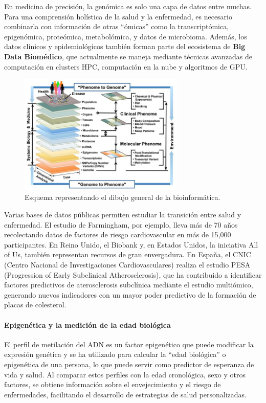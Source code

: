 En medicina de precisión, la genómica es solo una capa de datos entre muchas. Para una comprensión holística de la salud y la enfermedad, es necesario combinarla con información de otras “ómicas” como la transcriptómica, epigenómica, proteómica, metabolómica, y datos de microbioma. Además, los datos clínicos y epidemiológicos también forman parte del ecosistema de \textbf{Big Data Biomédico}, que actualmente se maneja mediante técnicas avanzadas de computación en clusters HPC, computación en la nube y algoritmos de GPU.

\begin{figure}[htbp]
\centering
\includegraphics[width = 0.7\textwidth]{figs/bigger-picture-bioinfo.jpg}
\caption{Esquema representando el dibujo general de la bioinformática.}
\end{figure}

Varias bases de datos públicas permiten estudiar la transición entre salud y enfermedad. El estudio de Farmingham, por ejemplo, lleva más de 70 años recolectando datos de factores de riesgo cardiovascular en más de 15,000 participantes. En Reino Unido, el Biobank y, en Estados Unidos, la iniciativa All of Us, también representan recursos de gran envergadura. En España, el CNIC (Centro Nacional de Investigaciones Cardiovasculares) realiza el estudio PESA (Progression of Early Subclinical Atherosclerosis), que ha contribuido a identificar factores predictivos de aterosclerosis subclínica mediante el estudio multiómico, generando nuevos indicadores con un mayor poder predictivo de la formación de placas de colesterol.

\paragraph{Epigenética y la medición de la edad biológica}
El perfil de metilación del ADN es un factor epigenético que puede modificar la expresión genética y se ha utilizado para calcular la “edad biológica” o epigenética de una persona, lo que puede servir como predictor de esperanza de vida y salud. Al comparar estos perfiles con la edad cronológica, sexo y otros factores, se obtiene información sobre el envejecimiento y el riesgo de enfermedades, facilitando el desarrollo de estrategias de salud personalizadas.

